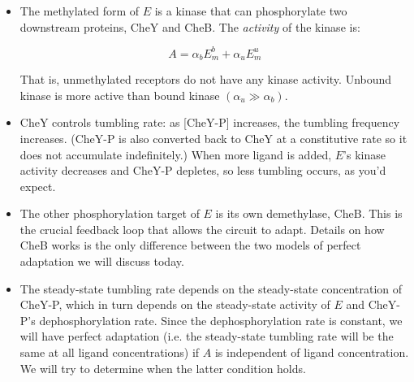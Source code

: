 \documentclass{article}
\begin{document}
\begin{itemize}
\item The methylated form of $E$ is a kinase that can phosphorylate two downstream proteins, CheY and CheB. The \textit{activity} of the kinase is:

\[ A = \alpha_b E_m^b + \alpha_u E_m^u \]

That is, unmethylated receptors do not have any kinase activity. Unbound kinase is more active than bound kinase $(\alpha_u \gg \alpha_b)$.

\item CheY controls tumbling rate: as [CheY-P] increases, the tumbling frequency increases. (CheY-P is also converted back to CheY at a constitutive rate so it does not accumulate indefinitely.) When more ligand is added, $E$'s kinase activity decreases and CheY-P depletes, so less tumbling occurs, as you'd expect.

\item The other phosphorylation target of $E$ is its own demethylase, CheB. This is the crucial feedback loop that allows the circuit to adapt. Details on how CheB works is the only difference between the two models of perfect adaptation we will discuss today.

\item The steady-state tumbling rate depends on the steady-state concentration of CheY-P, which in turn depends on the steady-state activity of $E$ and CheY-P's dephosphorylation rate. Since the dephosphorylation rate is constant, we will have perfect adaptation (i.e. the steady-state tumbling rate will be the same at all ligand concentrations) if $A$ is independent of ligand concentration. We will try to determine when the latter condition holds.

\end{itemize}
\end{document}
